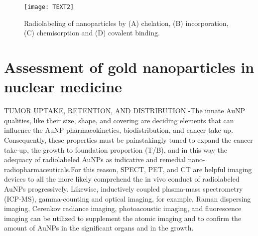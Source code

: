 \documentclass{article}
\begin{document}
\begin{figure}
\begin{center}
\texttt{[image: TEXT2]}
\end{center}
\caption{Radiolabeling of nanoparticles by (A) chelation, (B) incorporation, (C) chemisorption and (D) covalent binding.}
\end{figure}

\section*{Assessment of gold nanoparticles in nuclear medicine}

 TUMOR UPTAKE, RETENTION, AND DISTRIBUTION -The innate AuNP qualities, like their size, shape, and covering are deciding elements that can influence the AuNP pharmacokinetics, biodistribution, and cancer take-up. Consequently, these properties must be painstakingly tuned to expand the cancer take-up, the growth to foundation proportion (T/B), and in this way the adequacy of radiolabeled AuNPs as indicative and remedial nano-radiopharmaceuticals.For this reason, SPECT, PET, and CT are helpful imaging devices to all the more likely comprehend the in vivo conduct of radiolabeled AuNPs progressively. Likewise,
inductively coupled plasma-mass spectrometry (ICP-MS), gamma-counting and optical imaging, for example, Raman dispersing imaging, Cerenkov radiance imaging, photoacoustic imaging, and fluorescence imaging can be utilized to supplement the atomic imaging and to confirm the amount of AuNPs in the significant organs and in the growth.
\newline
\newline
\end{document}
